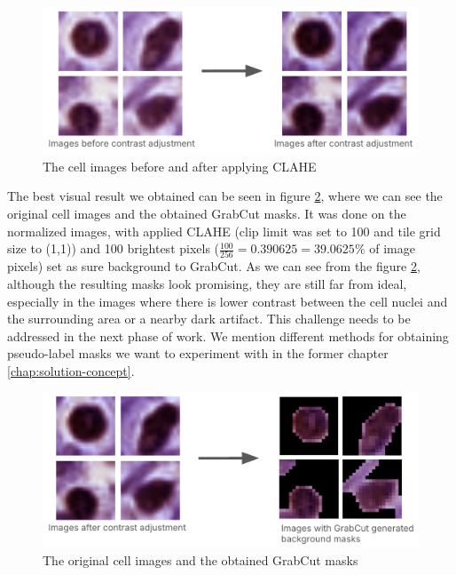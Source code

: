 \begin{figure}[H]
    \begin{centering}
    \includegraphics[width=14cm]{assets/images/work-cont-adj.png}
    \par\end{centering}
    \caption{The cell images before and after applying CLAHE}
    \label{fig:work-clahe}
\end{figure}

The best visual result we obtained can be seen in figure \ref{fig:work-grabcut}, where we can see the original cell images and the obtained GrabCut masks. It was done on the normalized images, with applied CLAHE (clip limit was set to 100 and tile grid size to (1,1)) and 100 brightest pixels ($\frac{100}{256} = 0.390625 = 39.0625\%$ of image pixels) set as sure background to GrabCut. As we can see from the figure \ref{fig:work-grabcut}, although the resulting masks look promising, they are still far from ideal, especially in the images where there is lower contrast between the cell nuclei and the surrounding area or a nearby dark artifact. This challenge needs to be addressed in the next phase of work. We mention different methods for obtaining pseudo-label masks we want to experiment with in the former chapter \ref{chap:solution-concept}. 

\begin{figure}[H]
    \begin{centering}
    \includegraphics[width=14cm]{assets/images/work-grabcut-result.png}
    \par\end{centering}
    \caption{The original cell images and the obtained GrabCut masks}
    \label{fig:work-grabcut}
\end{figure}
